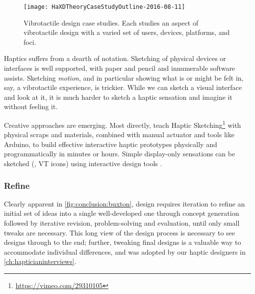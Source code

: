 \begin{figure}[htbp]
\begin{center}
\texttt{[image: HaXDTheoryCaseStudyOutline-2016-08-11]}
\caption{Vibrotactile design case studies. Each studies an aspect of vibrotactile design with a varied set of users, devices, platforms, and foci.}
\label{fig:intro:casestudyoverview}
\end{center}
\end{figure}



%


	Haptics suffers from a dearth of notation.
	Sketching of physical devices or interfaces is well supported, with paper and pencil and innumerable software assists.
	Sketching \textit{motion}, and in particular showing what is or might be felt in, say, a vibrotactile experience, is  trickier.
	While we can sketch a visual interface and look at it, it is much harder to sketch a haptic sensation and imagine it without feeling it.

Creative approaches are emerging.
Most directly, \citet{Moussette2011} teach Haptic Sketching\footnote{\url{https://vimeo.com/29310105}} with physical scraps and materials, combined with manual actuator and tools like Arduino, to build effective interactive haptic prototypes physically and programmatically  in minutes or hours.
Simple display-only sensations can be sketched (\eg, VT icons)  using interactive design tools \cite{schneider2014improvising,Hong2013}.





%
%
\subsubsection{Refine}
Clearly apparent in \autoref{fig:conclusion:buxton}, design requires iteration to refine an initial set of ideas into a single well-developed one through concept generation followed by iterative revision, problem-solving and  evaluation, until only small tweaks are necessary.
This long view of the design process is necessary to see designs through to the end;
further, tweaking final designs is a valuable way to accommodate individual differences, and was adopted by our haptic designers in \autoref{ch:hapticianinterviews}.

